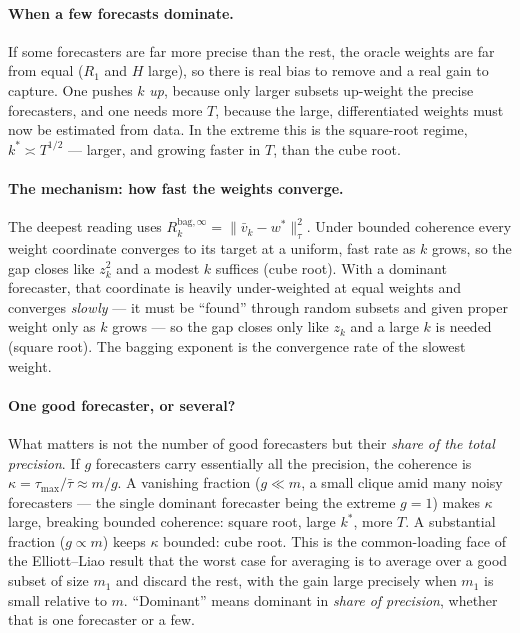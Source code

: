 \documentclass[11pt]{article}
\newcommand{\Rk}{R_k^{\mathrm{bag},\infty}}
\begin{document}
\paragraph{When a few forecasts dominate.} If some forecasters are far more precise than the
rest, the oracle weights are far from equal ($R_1$ and $H$ large), so there is real bias to
remove and a real gain to capture. One pushes $k$ \emph{up}, because only larger subsets
up-weight the precise forecasters, and one needs more $T$, because the large, differentiated
weights must now be estimated from data. In the extreme this is the square-root regime,
$k^\ast\asymp T^{1/2}$ --- larger, and growing faster in $T$, than the cube root.

\paragraph{The mechanism: how fast the weights converge.} The deepest reading uses
$\Rk=\|\bar v_k-w^\ast\|_\tau^2$. Under bounded coherence every weight coordinate converges
to its target at a uniform, fast rate as $k$ grows, so the gap closes like $z_k^2$ and a
modest $k$ suffices (cube root). With a dominant forecaster, that coordinate is heavily
under-weighted at equal weights and converges \emph{slowly} --- it must be ``found''
through random subsets and given proper weight only as $k$ grows --- so the gap closes only
like $z_k$ and a large $k$ is needed (square root). The bagging exponent is the convergence
rate of the slowest weight.

\paragraph{One good forecaster, or several?} What matters is not the number of good
forecasters but their \emph{share of the total precision}. If $g$ forecasters carry
essentially all the precision, the coherence is $\kappa=\tau_{\max}/\bar\tau\approx m/g$. A
vanishing fraction ($g\ll m$, a small clique amid many noisy forecasters --- the single
dominant forecaster being the extreme $g=1$) makes $\kappa$ large, breaking bounded
coherence: square root, large $k^\ast$, more $T$. A substantial fraction ($g\propto m$)
keeps $\kappa$ bounded: cube root. This is the common-loading face of the Elliott--Liao
result that the worst case for averaging is to average over a good subset of size $m_1$ and
discard the rest, with the gain large precisely when $m_1$ is small relative to $m$.
``Dominant'' means dominant in \emph{share of precision}, whether that is one forecaster or
a few.
\end{document}
